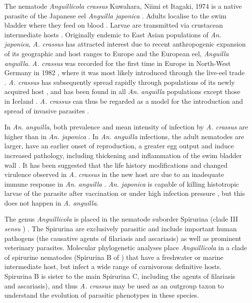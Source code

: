\documentclass[10pt]{bmc_article}
\newenvironment{bmcformat}{\begin{raggedright}\baselineskip20pt\sloppy\setboolean{publ}{false}}{\end{raggedright}\baselineskip20pt\sloppy}
\begin{document}
\begin{bmcformat}
The nematode \textit{Anguillicola crassus} Kuwahara, Niimi et Itagaki,
1974 is a native parasite of the Japanese eel \textit{Anguilla
  japonica} \cite{kuwahara_Niimi_Itagaki_1974}. Adults localise to the
swim bladder where they feed on blood
\cite{polzer_identification_1993}. Larvae are transmitted via
crustacean intermediate hosts
\cite{de_charleroy_life_1990}. Originally endemic to East Asian
populations of \textit{An. japonica}, \textit{A. crassus} has
attracted interest due to recent anthropogenic expansion of its
geographic and host ranges to Europe and the European eel,
\textit{Anguilla anguilla}. \textit{A. crassus} was recorded for the
first time in Europe in North-West Germany in 1982
\cite{fischer_teichwirt}, where it was most likely introduced through
the live-eel trade \cite{koops_anguillicola-infestations_1989,
  koie_swimbladder_1991}. \textit{A. crassus} has subsequently spread
rapidly through populations of its newly acquired host
\cite{kirk_impact_2003}, and has been found in all
\textit{An. anguilla} populations except those in Iceland
\cite{kristmundsson_parasite_2007}. \textit{A. crassus} can thus be
regarded as a model for the introduction and spread of invasive
parasites \cite{taraschewski_hosts_2007}.

In \textit{An. anguilla}, both prevalence and mean intensity of
infection by \textit{A. crassus} are higher than in \textit{
  An. japonica} \cite{mnderle_occurrence_2006,
  lefebvre_anguillicolosis:_2004}. In \textit{An.  anguilla}
infections, the adult nematodes are larger, have an earlier onset of
reproduction, a greater egg output \cite{knopf_differences_2004} and
induce increased pathology, including thickening and inflammation of
the swim bladder wall \cite{wurtz_tara_2000}. It has been suggested
that the life history modifications and changed virulence observed in
\textit{A. crassus} in the new host are due to an inadequate immune
response in \textit{An. anguilla}
\cite{knopf_swimbladder_2006}. \textit{An. japonica} is capable of
killing histotropic larvae of the parasite after vaccination
\cite{knopf_vaccination_2008} or under high infection pressure
\cite{heitlinger_massive_2009}, but this does not happen in
\textit{A. anguilla}.

The genus \textit{Anguillicola} is placed in the nematode suborder
Spirurina (clade III \textit{sensu} \cite{blaxter_molecular_1998})
\cite{nadler_molecular_2007, wijov_evolutionary_2006}. The Spirurina
are exclusively parasitic and include important human pathogens (the
causative agents of filariasis and ascariasis) as well as prominent
veterinary parasites. Molecular phylogenetic analyses place
\textit{Anguillicola} in a clade of spirurine nematodes (Spirurina B
of \cite{dl_py}) that have a freshwater or marine intermediate host,
but infect a wide range of carnivorous definitive hosts. Spirurina B
is sister to the main Spirurina C, including the agents of filariasis
and ascariasis), and thus \textit{A. crassus} may be used as an
outgroup taxon to understand the evolution of parasitic phenotypes in
these species.


\end{bmcformat}
\end{document}
